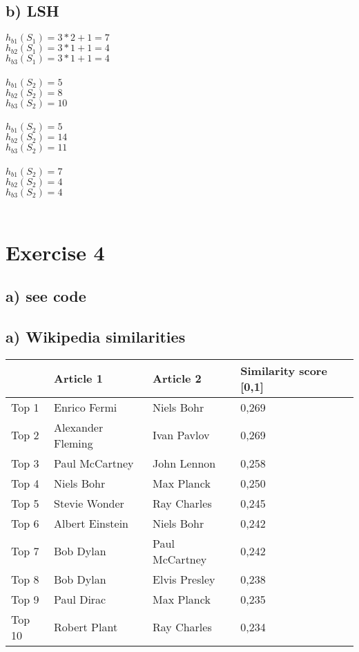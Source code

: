 \documentclass{article}
\begin{document}
\subsection*{b) LSH}
$h_{b1}(S_1) = 3 * 2 + 1 = 7$\\
$h_{b2}(S_1) = 3 * 1 + 1 = 4$\\
$h_{b3}(S_1) = 3 * 1 + 1 = 4$\\\\
$h_{b1}(S_2) = 5$\\
$h_{b2}(S_2) = 8$\\
$h_{b3}(S_2) = 10$\\\\
$h_{b1}(S_2) = 5$\\
$h_{b2}(S_2) = 14$\\
$h_{b3}(S_2) = 11$\\\\
$h_{b1}(S_2) = 7$\\
$h_{b2}(S_2) = 4$\\
$h_{b3}(S_2) = 4$\\\\

\section*{Exercise 4}
\subsection*{a) see code}
\subsection*{a) Wikipedia similarities}

\begin{tabular}{ l | l | l | l |}
& Article 1 & Article 2 & Similarity score [0,1] \\
  \hline          
Top 1 & Enrico Fermi & Niels Bohr & 0,269  \\             
Top 2 & Alexander Fleming & Ivan Pavlov & 0,269  \\             
Top 3 & Paul McCartney & John Lennon & 0,258  \\             
Top 4 & Niels Bohr & Max Planck & 0,250  \\             
Top 5 & Stevie Wonder & Ray Charles & 0,245  \\             
Top 6 & Albert Einstein & Niels Bohr & 0,242  \\             
Top 7 & Bob Dylan & Paul McCartney & 0,242  \\             
Top 8 & Bob Dylan & Elvis Presley & 0,238 \\             
Top 9 & Paul Dirac & Max Planck & 0,235 \\             
Top 10& Robert Plant & Ray Charles & 0,234 \\             
  \hline  
\end{tabular}
\end{document}
